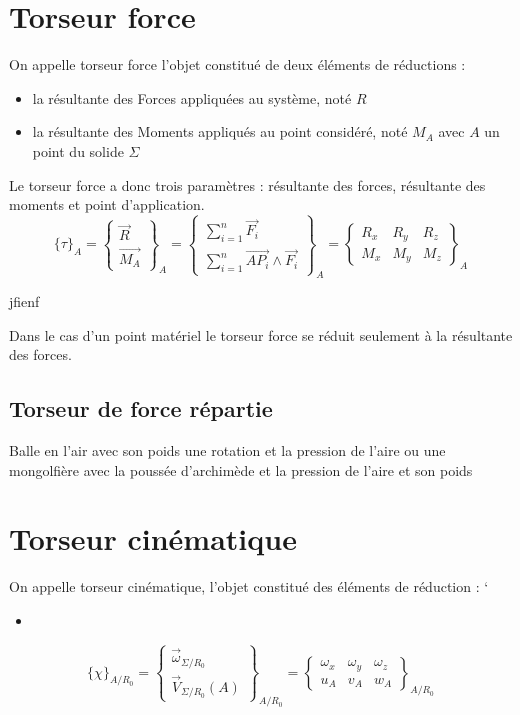 \section{Torseur force}
\begin{defi}
On appelle torseur force l'objet constitué de deux éléments de réductions :
\begin{itemize}
    \item la résultante des Forces appliquées au système, noté $R$
    \item la résultante des Moments appliqués au point considéré, noté $M_A$ avec $A$ un point du solide $\Sigma$
\end{itemize}
Le torseur force a donc trois paramètres : résultante des forces, résultante des moments et point d'application.
$$\{\tau\}_{A}=\begin{Bmatrix}\overrightarrow{R}\\\overrightarrow{M_A}\end{Bmatrix}_A=\begin{Bmatrix} \displaystyle\sum_{i=1}^{n}\overrightarrow{F_i}\\\displaystyle\sum_{i=1}^{n}\overrightarrow{AP_i}\land\overrightarrow{F_i}\end{Bmatrix}_A=\begin{Bmatrix} R_x & R_y  & R_z\\ M_x & M_y & M_z\end{Bmatrix}_A$$
\end{defi}
\begin{ex}
jfienf
\end{ex}
\begin{rmq}
Dans le cas d'un point matériel le torseur force se réduit seulement à la résultante des forces.
\end{rmq}
\subsection{Torseur de force répartie}

\begin{ex}
     Balle en l'air avec son poids une rotation et la pression de l'aire ou une mongolfière avec la poussée d'archimède et la pression de l'aire et son poids
\end{ex}
\section{Torseur cinématique}
\begin{defi}
On appelle torseur cinématique, l'objet constitué des éléments de réduction :
`\begin{itemize}
    \item 
\end{itemize}
$${\lbrace\chi\rbrace}_{A/R_0}=\begin{Bmatrix}\overrightarrow{\omega}_{\Sigma/R_0}\\\overrightarrow{V}_{\Sigma/R_0}(A)\end{Bmatrix}_{A/R_0}=\begin{Bmatrix} \omega_x & \omega_y  & \omega_z\\ u_A & v_A & w_A\end{Bmatrix}_{A/R_0}$$
\end{defi}
